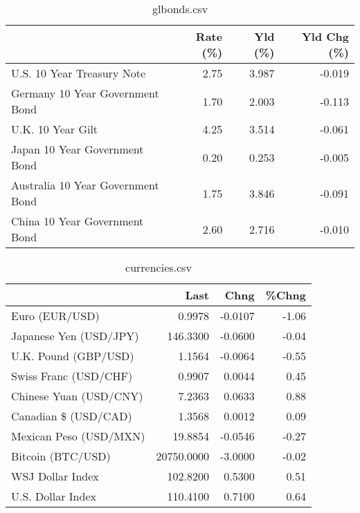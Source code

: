 \documentclass{article}%
\begin{document}
%


\begin{table}[htbp]%
\caption{glbonds.csv}%
\centering%
\begin{adjustbox}{width=1\textwidth}%
\begin{tabular}{lrrr}
\toprule
                                  &  Rate (\%) &  Yld (\%) &  Yld Chg (\%) \\
\midrule
       U.S. 10 Year Treasury Note &      2.75 &    3.987 &       -0.019 \\
  Germany 10 Year Government Bond &      1.70 &    2.003 &       -0.113 \\
                U.K. 10 Year Gilt &      4.25 &    3.514 &       -0.061 \\
    Japan 10 Year Government Bond &      0.20 &    0.253 &       -0.005 \\
Australia 10 Year Government Bond &      1.75 &    3.846 &       -0.091 \\
    China 10 Year Government Bond &      2.60 &    2.716 &       -0.010 \\
\bottomrule
\end{tabular}
%
\end{adjustbox}%
\end{table}

%


\begin{table}[htbp]%
\caption{currencies.csv}%
\centering%
\begin{adjustbox}{width=1\textwidth}%
\begin{tabular}{lrrr}
\toprule
                       &       Last &    Chng &  \%Chng \\
\midrule
        Euro (EUR/USD) &     0.9978 & -0.0107 &  -1.06 \\
Japanese Yen (USD/JPY) &   146.3300 & -0.0600 &  -0.04 \\
  U.K. Pound (GBP/USD) &     1.1564 & -0.0064 &  -0.55 \\
 Swiss Franc (USD/CHF) &     0.9907 &  0.0044 &   0.45 \\
Chinese Yuan (USD/CNY) &     7.2363 &  0.0633 &   0.88 \\
  Canadian \$ (USD/CAD) &     1.3568 &  0.0012 &   0.09 \\
Mexican Peso (USD/MXN) &    19.8854 & -0.0546 &  -0.27 \\
     Bitcoin (BTC/USD) & 20750.0000 & -3.0000 &  -0.02 \\
      WSJ Dollar Index &   102.8200 &  0.5300 &   0.51 \\
     U.S. Dollar Index &   110.4100 &  0.7100 &   0.64 \\
\bottomrule
\end{tabular}
%
\end{adjustbox}%
\end{table}

%
\end{document}
